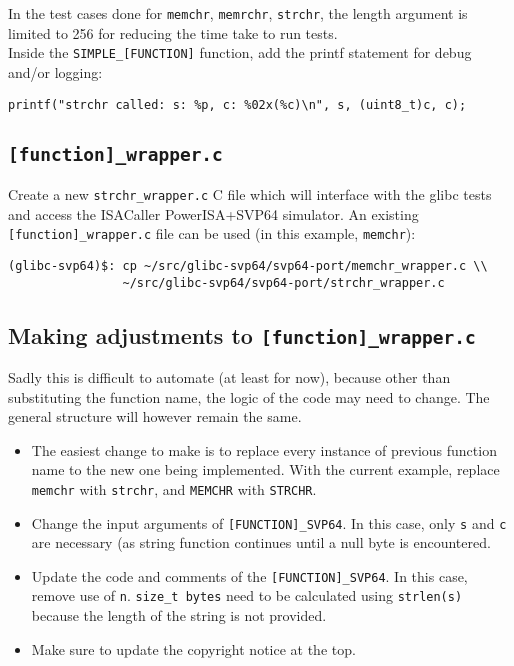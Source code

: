 In the test cases done for \texttt{memchr}, \texttt{memrchr}, \texttt{strchr},
the length argument is limited to 256 for reducing the time take to run tests.\\

Inside the \texttt{SIMPLE\_[FUNCTION]} function, add the printf statement
for debug and/or logging:

\begin{verbatim}
printf("strchr called: s: %p, c: %02x(%c)\n", s, (uint8_t)c, c);
\end{verbatim}

\subsection{\texttt{[function]\_wrapper.c}}

Create a new \texttt{strchr\_wrapper.c} C file which will interface with
the glibc tests and access the ISACaller PowerISA+SVP64 simulator. An existing
\texttt{[function]\_wrapper.c} file can be used (in this example,
\texttt{memchr}):

\begin{verbatim}
(glibc-svp64)$: cp ~/src/glibc-svp64/svp64-port/memchr_wrapper.c \\
                ~/src/glibc-svp64/svp64-port/strchr_wrapper.c
\end{verbatim}

\subsection{Making adjustments to \texttt{[function]\_wrapper.c}}

Sadly this is difficult to automate (at least for now), because other than
substituting the function name, the logic of the code may need to change.
The general structure will however remain the same.

\begin{itemize}
  \item The easiest change to make is to replace every instance of previous
  function name to the new one being implemented. With the current example,
  replace \texttt{memchr} with \texttt{strchr},
  and \texttt{MEMCHR} with \texttt{STRCHR}.
  \item Change the input arguments of \texttt{[FUNCTION]\_SVP64}.
  In this case, only \texttt{s} and \texttt{c} are necessary
  (as string function continues until a null byte is encountered.
  \item Update the code and comments of the \texttt{[FUNCTION]\_SVP64}.
  In this case, remove use of \texttt{n}. \texttt{size\_t bytes} need to be
  calculated using \texttt{strlen(s)} because the length of the string
  is not provided.
  \item Make sure to update the copyright notice at the top.
\end{itemize}


